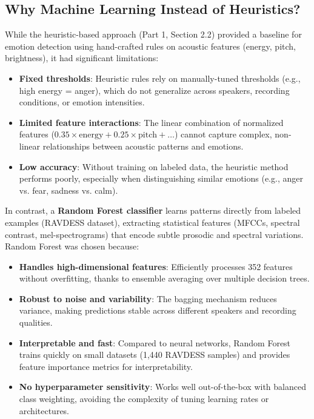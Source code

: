 \documentclass[12pt,letterpaper]{article}
\begin{document}
\subsection{Why Machine Learning Instead of Heuristics?}
While the heuristic-based approach (Part 1, Section 2.2) provided a baseline for emotion detection using hand-crafted rules on acoustic features (energy, pitch, brightness), it had significant limitations:
\begin{itemize}
    \item \textbf{Fixed thresholds}: Heuristic rules rely on manually-tuned thresholds (e.g., high energy = anger), which do not generalize across speakers, recording conditions, or emotion intensities.
    \item \textbf{Limited feature interactions}: The linear combination of normalized features ($0.35 \times \text{energy} + 0.25 \times \text{pitch} + \ldots$) cannot capture complex, non-linear relationships between acoustic patterns and emotions.
    \item \textbf{Low accuracy}: Without training on labeled data, the heuristic method performs poorly, especially when distinguishing similar emotions (e.g., anger vs. fear, sadness vs. calm).
\end{itemize}

In contrast, a \textbf{Random Forest classifier} learns patterns directly from labeled examples (RAVDESS dataset), extracting statistical features (MFCCs, spectral contrast, mel-spectrograms) that encode subtle prosodic and spectral variations. Random Forest was chosen because:
\begin{itemize}
    \item \textbf{Handles high-dimensional features}: Efficiently processes 352 features without overfitting, thanks to ensemble averaging over multiple decision trees.
    \item \textbf{Robust to noise and variability}: The bagging mechanism reduces variance, making predictions stable across different speakers and recording qualities.
    \item \textbf{Interpretable and fast}: Compared to neural networks, Random Forest trains quickly on small datasets (1,440 RAVDESS samples) and provides feature importance metrics for interpretability.
    \item \textbf{No hyperparameter sensitivity}: Works well out-of-the-box with balanced class weighting, avoiding the complexity of tuning learning rates or architectures.
\end{itemize}
\end{document}
